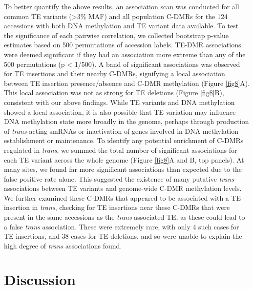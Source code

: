 \documentclass[12pt]{article}
\begin{document}
To better quantify the above results, an association scan was conducted
for all common TE variants (\textgreater{}3\% MAF) and all population
C-DMRs for the 124 accessions with both DNA methylation and TE variant
data available. To test the significance of each pairwise correlation,
we collected bootstrap p-value estimates based on 500 permutations of
accession labels. TE-DMR associations were deemed significant if they
had an association more extreme than any of the 500 permutations (p
\textless{} 1/500). A band of significant associations was observed for
TE insertions and their nearby C-DMRs, signifying a local association
between TE insertion presence/absence and C-DMR methylation (Figure \ref{fig8}A).
This local association was not as strong for TE deletions (Figure \ref{fig8}B),
consistent with our above findings. While TE variants and DNA
methylation showed a local association, it is also possible that TE
variation may influence DNA methylation state more broadly in the
genome, perhaps through production of \emph{trans-}acting smRNAs or
inactivation of genes involved in DNA methylation establishment or
maintenance. To identify any potential enrichment of C-DMRs regulated in
\emph{trans}, we summed the total number of significant associations for
each TE variant across the whole genome (Figure \ref{fig8}A and B, top panels).
At many sites, we found far more significant associations than expected
due to the false positive rate alone. This suggested the existence of
many putative \emph{trans }associations between TE variants and
genome-wide C-DMR methylation levels. We further examined these C-DMRs
that appeared to be associated with a TE insertion in \emph{trans},
checking for TE insertions near these C-DMRs that were present in the
same accessions as the \emph{trans }associated TE, as these could lead
to a false \emph{trans }association. These were extremely rare, with
only 4 such cases for TE insertions, and 38 cases for TE deletions, and
so were unable to explain the high degree of \emph{trans }associations
found.

\section{Discussion}
\end{document}
